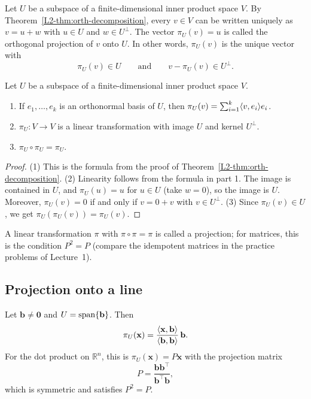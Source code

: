 \begin{definition}
    Let $U$ be a subspace of a finite-dimensional inner product space $V$. By Theorem~\ref{L2-thm:orth-decomposition}, every $v \in V$ can be written uniquely as $v = u + w$ with $u \in U$ and $w \in U^\perp$. The vector $\pi_U(v) = u$ is called the orthogonal projection of $v$ onto $U$. In other words, $\pi_U(v)$ is the unique vector with
    \[\pi_U(v) \in U \qquad \text{and} \qquad v - \pi_U(v) \in U^\perp.\]
\end{definition}

\begin{proposition}\label{L2-prop:projection-properties}
    Let $U$ be a subspace of a finite-dimensional inner product space $V$.
    \begin{enumerate}
        \item If $e_1, \ldots, e_k$ is an orthonormal basis of $U$, then $\pi_U(v) = \sum_{i=1}^k \langle v, e_i \rangle e_i$.
        \item $\pi_U: V \to V$ is a linear transformation with image $U$ and kernel $U^\perp$.
        \item $\pi_U \circ \pi_U = \pi_U$.
    \end{enumerate}
\end{proposition}

\begin{proof}
    (1) This is the formula from the proof of Theorem~\ref{L2-thm:orth-decomposition}. (2) Linearity follows from the formula in part 1. The image is contained in $U$, and $\pi_U(u) = u$ for $u \in U$ (take $w = 0$), so the image is $U$. Moreover, $\pi_U(v) = 0$ if and only if $v = 0 + v$ with $v \in U^\perp$. (3) Since $\pi_U(v) \in U$, we get $\pi_U(\pi_U(v)) = \pi_U(v)$.
\end{proof}

A linear transformation $\pi$ with $\pi \circ \pi = \pi$ is called a projection; for matrices, this is the condition $P^2 = P$ (compare the idempotent matrices in the practice problems of Lecture~1).

\subsection{Projection onto a line}

\begin{proposition}\label{L2-prop:projection-line}
    Let $\mathbf{b} \neq \mathbf{0}$ and $U = \operatorname{span}\{\mathbf{b}\}$. Then
    \[\pi_U(\mathbf{x}) = \frac{\langle \mathbf{x}, \mathbf{b} \rangle}{\langle \mathbf{b}, \mathbf{b} \rangle} \, \mathbf{b}.\]
    For the dot product on $\mathbb{R}^n$, this is $\pi_U(\mathbf{x}) = P\mathbf{x}$ with the projection matrix
    \[P = \frac{\mathbf{b} \mathbf{b}^\top}{\mathbf{b}^\top \mathbf{b}},\]
    which is symmetric and satisfies $P^2 = P$.
\end{proposition}

